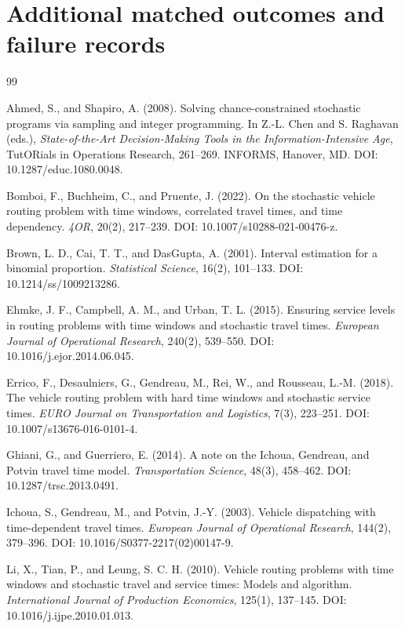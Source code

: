 \documentclass[11pt,a4paper]{article}
\begin{document}
\section{Additional matched outcomes and failure records}

\clearpage

\begingroup
\small
\begin{thebibliography}{99}

Ahmed, S., and Shapiro, A. (2008). Solving chance-constrained stochastic
programs via sampling and integer programming. In Z.-L. Chen and S. Raghavan
(eds.), \emph{State-of-the-Art Decision-Making Tools in the
Information-Intensive Age}, TutORials in Operations Research, 261--269.
INFORMS, Hanover, MD. DOI: 10.1287/educ.1080.0048.

Bomboi, F., Buchheim, C., and Pruente, J. (2022). On the stochastic vehicle
routing problem with time windows, correlated travel times, and time
dependency. \emph{4OR}, 20(2), 217--239. DOI:
10.1007/s10288-021-00476-z.

Brown, L. D., Cai, T. T., and DasGupta, A. (2001). Interval estimation for a
binomial proportion. \emph{Statistical Science}, 16(2), 101--133. DOI:
10.1214/ss/1009213286.

Ehmke, J. F., Campbell, A. M., and Urban, T. L. (2015). Ensuring service
levels in routing problems with time windows and stochastic travel times.
\emph{European Journal of Operational Research}, 240(2), 539--550. DOI:
10.1016/j.ejor.2014.06.045.

Errico, F., Desaulniers, G., Gendreau, M., Rei, W., and Rousseau, L.-M. (2018).
The vehicle routing problem with hard time windows and stochastic service
times. \emph{EURO Journal on Transportation and Logistics}, 7(3), 223--251.
DOI: 10.1007/s13676-016-0101-4.

Ghiani, G., and Guerriero, E. (2014). A note on the Ichoua, Gendreau, and
Potvin travel time model. \emph{Transportation Science}, 48(3), 458--462.
DOI: 10.1287/trsc.2013.0491.

Ichoua, S., Gendreau, M., and Potvin, J.-Y. (2003). Vehicle dispatching with
time-dependent travel times. \emph{European Journal of Operational Research},
144(2), 379--396. DOI: 10.1016/S0377-2217(02)00147-9.

Li, X., Tian, P., and Leung, S. C. H. (2010). Vehicle routing problems with
time windows and stochastic travel and service times: Models and algorithm.
\emph{International Journal of Production Economics}, 125(1), 137--145.
DOI: 10.1016/j.ijpe.2010.01.013.


\end{thebibliography}
\end{document}
